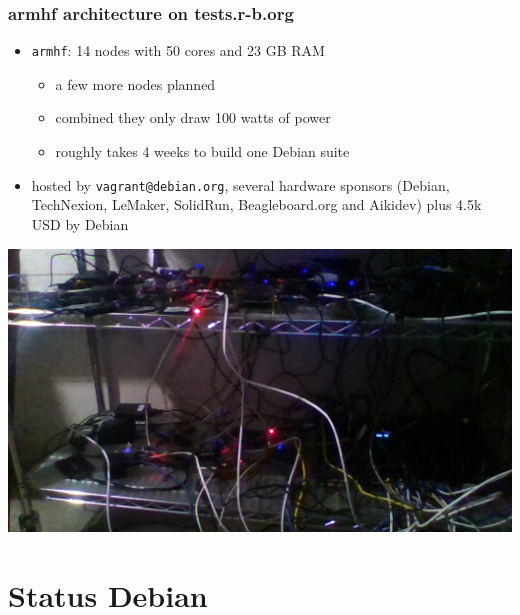 \documentclass[14pt]{beamer}
\begin{document}
\begin{frame}
 \frametitle{armhf architecture on tests.r-b.org}

 \begin{itemize}
  \item \texttt{armhf}: 14 nodes with 50 cores and 23 GB RAM
  \begin{itemize}
   \item a few more nodes planned
   \item combined they only draw 100 watts of power
   \item<2> roughly takes 4 weeks to build one Debian suite
  \end{itemize}
  \item \small{hosted by \texttt{vagrant@debian.org}, several hardware sponsors
  (Debian, TechNexion, LeMaker, SolidRun, Beagleboard.org and Aikidev)
  plus 4.5k USD by Debian}
\end{itemize}
 \begin{center}
  \includegraphics[height=0.42\paperheight]{images/2016-01-26-180836.jpg}
  \vfill
 \end{center}
\end{frame}

\section{Status Debian}
\end{document}
